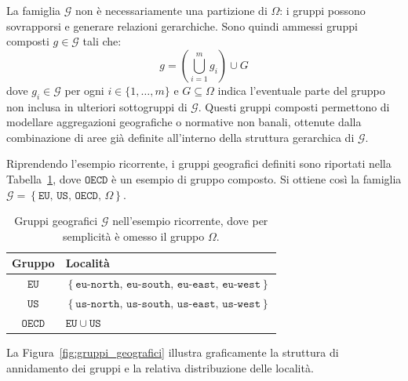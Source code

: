 La famiglia $\mathcal{G}$ non è necessariamente una partizione di $\Omega$: i gruppi possono sovrapporsi e generare relazioni gerarchiche. Sono quindi ammessi gruppi composti $g \in \mathcal{G}$ tali che:
\begin{equation}
    g = \left( \bigcup_{i=1}^{m} g_i \right) \cup G
\end{equation}
dove $g_i \in \mathcal{G}$ per ogni $i \in \{1,\dots,m\}$ e $G \subseteq \Omega$ indica l'eventuale parte del gruppo non inclusa in ulteriori sottogruppi di $\mathcal{G}$. Questi gruppi composti permettono di modellare aggregazioni geografiche o normative non banali, ottenute dalla combinazione di aree già definite all'interno della struttura gerarchica di $\mathcal{G}$. 

Riprendendo l'esempio ricorrente, i gruppi geografici definiti sono riportati nella Tabella~\ref{tab:gruppi_geografici}, dove $\mathtt{OECD}$ è un esempio di gruppo composto. Si ottiene così la famiglia $\mathcal{G} = \left\{ \mathtt{EU},\, \mathtt{US},\, \mathtt{OECD},\, \Omega \right\}$.
 
\begin{table}[ht]
    \centering
    \begin{tabular}{cl}
        \toprule
        \textbf{Gruppo} & \textbf{Località} \\
        \midrule
        $\mathtt{EU}$ & 
        $\left\{ \mathtt{eu\text{-}north},\, \mathtt{eu\text{-}south},\, \mathtt{eu\text{-}east},\, \mathtt{eu\text{-}west} \right\}$ 
        \\
        $\mathtt{US}$ & 
        $\left\{ \mathtt{us\text{-}north},\, \mathtt{us\text{-}south},\, \mathtt{us\text{-}east},\, \mathtt{us\text{-}west} \right\}$ 
        \\
        $\mathtt{OECD}$ & 
        $\mathtt{EU} \cup \mathtt{US}$ 
        \\
        \bottomrule
    \end{tabular}
    \caption{Gruppi geografici $\mathcal{G}$ nell'esempio ricorrente, dove per semplicità è omesso il gruppo $\Omega$.}
    \label{tab:gruppi_geografici}
\end{table}

La Figura~\ref{fig:gruppi_geografici} illustra graficamente la struttura di annidamento dei gruppi e la relativa distribuzione delle località.

